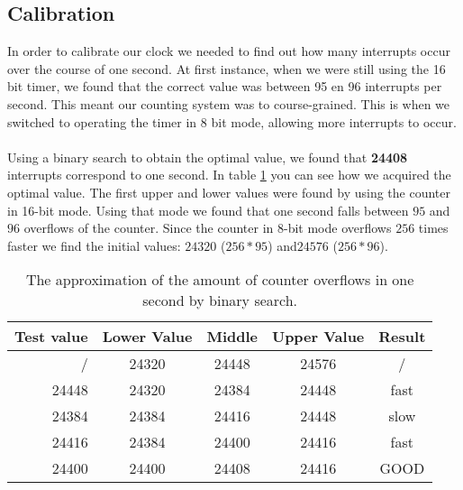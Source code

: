 \documentclass[11pt]{article}
\begin{document}
\subsection{Calibration}
In order to calibrate our clock we needed to find out how many interrupts occur over the course of one second.
At first instance, when we were still using the 16 bit timer, we found that the correct value was between 95 en 96 interrupts per second.
This meant our counting system was to course-grained.
This is when we switched to operating the timer in 8 bit mode, allowing more interrupts to occur.  
\\\\
Using a binary search to obtain the optimal value, we found that \textbf{24408} interrupts correspond to one second.
In table \ref{tab:bs} you can see how we acquired the optimal value. 
The first upper and lower values were found by using the counter in 16-bit mode.
Using that mode we found that one second falls between $95$ and $96$ overflows of the counter.
Since the counter in 8-bit mode overflows $256$ times faster we find the initial values: $24320$ ($256*95$) and$24576$ ($256*96$).

\begin{table}
	\centering
	\begin{tabular}{|r || c | c | c | c |}
		\hline
		Test value & Lower Value & Middle & Upper Value & Result \\ \hline
		/ & 24320 &  24448 & 24576 & / \\ \hline
		24448 & 24320 & 24384 & 24448 & fast \\ \hline
		24384 & 24384 & 24416 & 24448 & slow \\ \hline
		24416 & 24384 & 24400 & 24416 & fast \\ \hline
		24400 & 24400 & 24408 & 24416 & GOOD \\ \hline
	\end{tabular}
	\caption{The approximation of the amount of counter overflows in one second by binary search.}
	\label{tab:bs}
\end{table}
\end{document}
